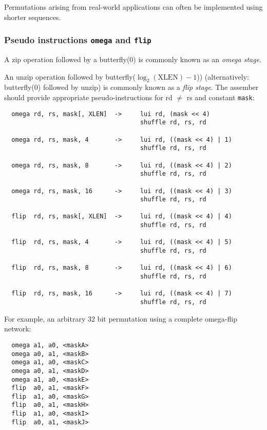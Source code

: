 Permutations arising from real-world applications can often be implemented using
shorter sequences.

\subsubsection{Pseudo instructions {\tt omega} and {\tt flip}}

A zip operation followed by a butterfly(0) is commonly known as an {\it omega stage}.

An unzip operation followed by butterfly($\log_2(\textrm{XLEN})-1$))
(alternatively: butterfly(0) followed by unzip) is commonly known as a {\it flip
stage}. The assember should provide appropriate pseudo-instructions for rd
$\neq$ rs and constant {\tt mask}:

\begin{verbatim}
  omega rd, rs, mask[, XLEN]  ->     lui rd, (mask << 4)
                                     shuffle rd, rs, rd

  omega rd, rs, mask, 4       ->     lui rd, ((mask << 4) | 1)
                                     shuffle rd, rs, rd

  omega rd, rs, mask, 8       ->     lui rd, ((mask << 4) | 2)
                                     shuffle rd, rs, rd

  omega rd, rs, mask, 16      ->     lui rd, ((mask << 4) | 3)
                                     shuffle rd, rs, rd

  flip  rd, rs, mask[, XLEN]  ->     lui rd, ((mask << 4) | 4)
                                     shuffle rd, rs, rd

  flip  rd, rs, mask, 4       ->     lui rd, ((mask << 4) | 5)
                                     shuffle rd, rs, rd

  flip  rd, rs, mask, 8       ->     lui rd, ((mask << 4) | 6)
                                     shuffle rd, rs, rd

  flip  rd, rs, mask, 16      ->     lui rd, ((mask << 4) | 7)
                                     shuffle rd, rs, rd
\end{verbatim}

For example, an arbitrary 32 bit permutation using a complete omega-flip network:

\begin{verbatim}
  omega a1, a0, <maskA>
  omega a0, a1, <maskB>
  omega a1, a0, <maskC>
  omega a0, a1, <maskD>
  omega a1, a0, <maskE>
  flip  a0, a1, <maskF>
  flip  a1, a0, <maskG>
  flip  a0, a1, <maskH>
  flip  a1, a0, <maskI>
  flip  a0, a1, <maskJ>
\end{verbatim}

